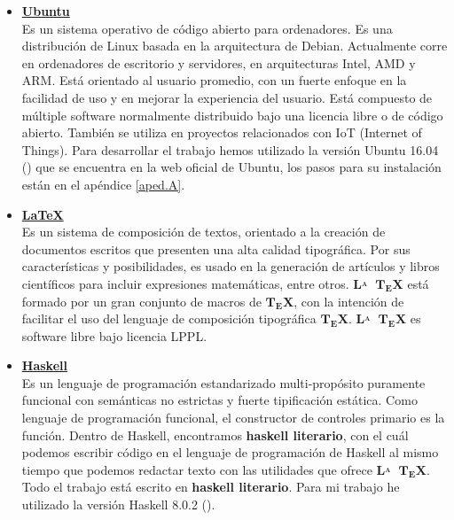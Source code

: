 \begin{itemize}

\item \href{https://www.ubuntu.com/}{\textbf{Ubuntu}}\\
Es un sistema operativo de código abierto para ordenadores. Es una distribución de Linux basada en la arquitectura de Debian. Actualmente corre en ordenadores de escritorio y servidores, en arquitecturas Intel, AMD y ARM. Está orientado al usuario promedio, con un fuerte enfoque en la facilidad de uso y en mejorar la experiencia del usuario. Está compuesto de múltiple software normalmente distribuido bajo una licencia libre o de código abierto. También se utiliza en proyectos relacionados con IoT (Internet of Things). Para desarrollar el trabajo hemos utilizado la versión Ubuntu 16.04 (\cite{ubuntu}) que se encuentra en la web oficial de Ubuntu, los pasos para su instalación están en el apéndice \ref{aped.A}. 

\item \href{https://www.latex-project.org/}{\textbf{LaTeX}}  \\
Es un sistema de composición de textos, orientado a la creación de documentos escritos que presenten una alta calidad tipográfica. Por sus características y posibilidades, es usado en la generación de artículos y libros científicos para incluir expresiones matemáticas, entre otros.  $\mathbf{L\!\!^{{}_{\scriptstyle A}} \!\!\!\!\!\;\; T\!_{\displaystyle E} \! X}$ está formado por un gran conjunto de macros de  $\mathbf{T\!_{\displaystyle E} \! X}$, con la intención de facilitar el uso del lenguaje de composición tipográfica ${\displaystyle \mathbf {T\!_{\displaystyle E}\!X} }$. $\mathbf{L\!\!^{{}_{\scriptstyle A}} \!\!\!\!\!\;\; T\!_{\displaystyle E} \! X}$ es software libre bajo licencia LPPL. 

\item \href{https://www.haskell.org/}{\textbf{Haskell}}\\
Es un lenguaje de programación estandarizado multi-propósito puramente funcional con semánticas no estrictas y fuerte tipificación estática. Como lenguaje de programación funcional, el constructor de controles primario es la función. Dentro de Haskell, encontramos \textbf{haskell literario}, con el cuál podemos escribir código en el lenguaje de programación de Haskell al mismo tiempo que podemos redactar texto con las utilidades que ofrece $\mathbf{L\!\!^{{}_{\scriptstyle A}} \!\!\!\!\!\;\; T\!_{\displaystyle E} \! X}$. Todo el trabajo está escrito en  \textbf{haskell literario}. Para mi trabajo he utilizado la versión Haskell 8.0.2 (\cite{haskell8}).


\end{itemize}
